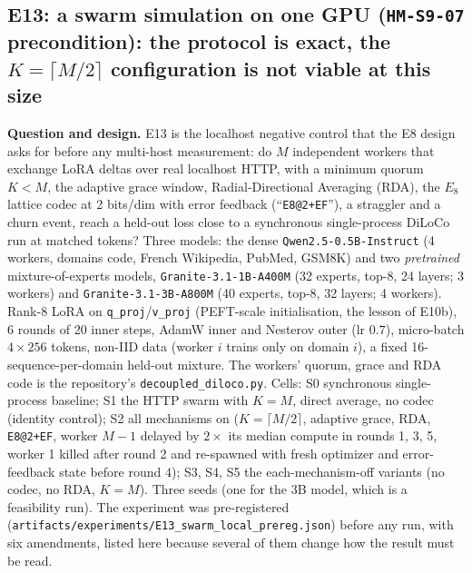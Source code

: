 \documentclass[11pt,a4paper]{article}
\begin{document}
\subsection{E13: a swarm simulation on one GPU (\texttt{HM-S9-07} precondition): the protocol is exact, the $K=\lceil M/2\rceil$ configuration is not viable at this size}
\label{sec:e13}

\textbf{Question and design.} E13 is the localhost negative control that the E8 design asks for before any multi-host measurement: do $M$ independent workers that exchange LoRA deltas over real localhost HTTP, with a minimum quorum $K<M$, the adaptive grace window, Radial-Directional Averaging (RDA), the $E_8$ lattice codec at 2 bits/dim with error feedback (``\texttt{E8@2+EF}''), a straggler and a churn event, reach a held-out loss close to a synchronous single-process DiLoCo run at matched tokens? Three models: the dense \texttt{Qwen2.5-0.5B-Instruct} (4 workers, domains code, French Wikipedia, PubMed, GSM8K) and two \emph{pretrained} mixture-of-experts models, \texttt{Granite-3.1-1B-A400M} (32 experts, top-8, 24 layers; 3 workers) and \texttt{Granite-3.1-3B-A800M} (40 experts, top-8, 32 layers; 4 workers). Rank-8 LoRA on \texttt{q\_proj}/\texttt{v\_proj} (PEFT-scale initialisation, the lesson of E10b), 6 rounds of 20 inner steps, AdamW inner and Nesterov outer (lr $0.7$), micro-batch $4\times256$ tokens, non-IID data (worker $i$ trains only on domain $i$), a fixed 16-sequence-per-domain held-out mixture. The workers' quorum, grace and RDA code is the repository's \texttt{decoupled\_diloco.py}. Cells: S0 synchronous single-process baseline; S1 the HTTP swarm with $K=M$, direct average, no codec (identity control); S2 all mechanisms on ($K=\lceil M/2\rceil$, adaptive grace, RDA, \texttt{E8@2+EF}, worker $M{-}1$ delayed by $2\times$ its median compute in rounds 1, 3, 5, worker 1 killed after round 2 and re-spawned with fresh optimizer and error-feedback state before round 4); S3, S4, S5 the each-mechanism-off variants (no codec, no RDA, $K=M$). Three seeds (one for the 3B model, which is a feasibility run). The experiment was pre-registered (\texttt{artifacts/experiments/E13\_swarm\_local\_prereg.json}) before any run, with six amendments, listed here because several of them change how the result must be read.
\end{document}
